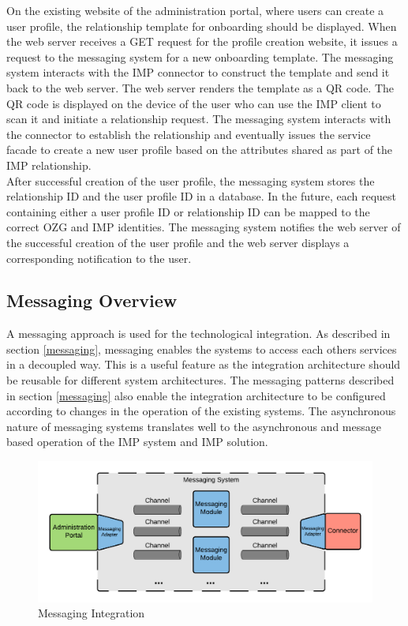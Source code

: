 On the existing website of the administration portal, where users can create a user profile, the relationship template for onboarding should be displayed. When the web server receives a GET request for the profile creation website, it issues a request to the messaging system for a new onboarding template. The messaging system interacts with the IMP connector to construct the template and send it back to the web server. The web server renders the template as a QR code. The QR code is displayed on the device of the user who can use the IMP client to scan it and initiate a relationship request. The messaging system interacts with the connector to establish the relationship and eventually issues the service facade to create a new user profile based on the attributes shared as part of the IMP relationship. \\
After successful creation of the user profile, the messaging system stores the relationship ID and the user profile ID in a database. In the future, each request containing either a user profile ID or relationship ID can be mapped to the correct OZG and IMP identities. The messaging system notifies the web server of the successful creation of the user profile and the web server displays a corresponding notification to the user.

\subsection{Messaging Overview}

A messaging approach is used for the technological integration. As described in section \ref{messaging}, messaging enables the systems to access each others services in a decoupled way. This is a useful feature as the integration architecture should be reusable for different system architectures. The messaging patterns described in section \ref{messaging} also enable the integration architecture to be configured according to changes in the operation of the existing systems. The asynchronous nature of messaging systems translates well to the asynchronous and message based operation of the IMP system and IMP solution.

\begin{figure}[h!]
    \centering
    \includegraphics[scale=0.6]{Diagrams/Integration Architecture 1/Technological Integration/3. Messaging Integration.pdf}
    \caption{Messaging Integration}
    \label{integration1:messaging_integration}
\end{figure}

